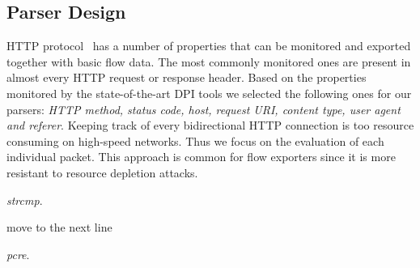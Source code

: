 \subsection{Parser Design} \label{subsec:http-tool_design}

HTTP protocol~\cite{rfc7230} has a number of properties that can be monitored and exported together with basic flow data. The most commonly monitored ones are present in almost every HTTP request or response header. Based on the properties monitored by the state-of-the-art DPI tools we selected the following ones for our parsers: \emph{HTTP method, status code, host, request URI, content type, user agent and referer}. Keeping track of every bidirectional HTTP connection is too resource consuming on high-speed networks. Thus we focus on the evaluation of each individual packet. This approach is common for flow exporters since it is more resistant to resource depletion attacks.

\noindent\hspace{1pt}
\begin{minipage}[t]{(0.49\textwidth)-2pt}
\begin{algorithm}[H]
\caption{\emph{strcmp}.}
\label{alg:strcmp}
{%
\begin{algorithmic}[1]
                \ENDIF
            \ENDFOR
            \STATE move to the next line
        \ENDWHILE
    \ELSE 
    \ENDIF
\end{algorithmic}
}
\end{algorithm}
\end{minipage}%
\hfill
\begin{minipage}[t]{0.47\textwidth}
\begin{algorithm}[H]
\caption{\emph{pcre}.}
\label{alg:pcre}
{%
\begin{algorithmic}[1]
            \ENDIF
        \ENDFOR
    \ELSE 
    \ENDIF
\end{algorithmic}
}
\end{algorithm}
\end{minipage}
\vspace{10pt}

